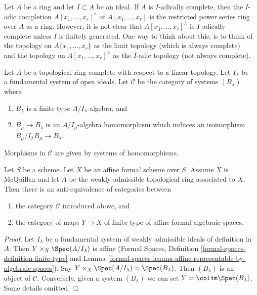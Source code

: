 \begin{remark}
\label{remark-I-adic-completion-and-restricted-power-series}
Let $A$ be a ring and let $I \subset A$ be an ideal.
If $A$ is $I$-adically complete, then the $I$-adic completion
$A[x_1, \ldots, x_r]^\wedge$ of $A[x_1, \ldots, x_r]$ is the
restricted power series ring over $A$ as a ring. However, it is not clear
that $A[x_1, \ldots, x_r]^\wedge$ is $I$-adically complete
unless $I$ is finitely generated. One way to think about this, is
to think of the topology on $A\{x_1, \ldots, x_r\}$ as the limit
topology (which is always complete) and the topology on
$A[x_1, \ldots, x_r]^\wedge$ as the $I$-adic topology (not always complete).
\end{remark}

\noindent
Let $A$ be a topological ring complete with respect to a linear
topology. Let $I_\lambda$ be a fundamental system of open ideals.
Let $\mathcal{C}$ be the category of systems $(B_\lambda)$ where
\begin{enumerate}
\item $B_\lambda$ is a finite type $A/I_\lambda$-algebra, and
\item $B_\mu \to B_\lambda$ is an $A/I_\mu$-algebra homomorphism
which induces an isomorphism $B_\mu/I_\lambda B_\mu \to B_\lambda$.
\end{enumerate}
Morphisms in $\mathcal{C}$ are given by systems of homomorphisms.

\begin{lemma}
\label{lemma-category-affine-over}
Let $S$ be a scheme. Let $X$ be an affine formal scheme over $S$.
Assume $X$ is McQuillan and let $A$ be the weakly admissible topological
ring associated to $X$. Then there is an anti-equivalence of categories
between
\begin{enumerate}
\item the category $\mathcal{C}$ introduced above, and
\item the category of maps $Y \to X$ of finite type of
affine formal algebraic spaces.
\end{enumerate}
\end{lemma}

\begin{proof}
Let $I_\lambda$ be a fundamental system of weakly admissible ideals
of definition in $A$. Then $Y \times_X \Spec(A/I_\lambda)$ is
affine (Formal Spaces, Definition \ref{formal-spaces-definition-finite-type}
and Lemma \ref{formal-spaces-lemma-affine-representable-by-algebraic-spaces}).
Say $Y \times_X \Spec(A/I_\lambda) = \Spec(B_\lambda)$.
Then $(B_\lambda)$ is an object of $\mathcal{C}$.
Conversely, given a system $(B_\lambda)$ we can set
$Y = \colim \Spec(B_\lambda)$. Some details omitted.
\end{proof}

